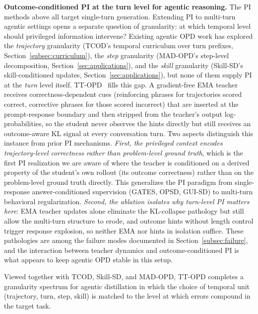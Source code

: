 \documentclass{article} %
\begin{document}
\textbf{Outcome-conditioned PI at the turn level for agentic reasoning.} The PI methods above all target single-turn generation. Extending PI to multi-turn agentic settings opens a separate question of granularity: at which temporal level should privileged information intervene? Existing agentic OPD work has explored the \emph{trajectory} granularity (TCOD's temporal curriculum over turn prefixes, Section~\ref{subsec:curriculum}), the \emph{step} granularity (MAD-OPD's step-level decomposition, Section~\ref{sec:applications}), and the \emph{skill} granularity (Skill-SD's skill-conditioned updates, Section~\ref{sec:applications}), but none of them supply PI at the \emph{turn} level itself. TT-OPD~\citep{ttopd2026} fills this gap. A gradient-free EMA teacher receives correctness-dependent cues (reinforcing phrases for trajectories scored correct, corrective phrases for those scored incorrect) that are inserted at the prompt-response boundary and then stripped from the teacher's output log-probabilities, so the student never observes the hints directly but still receives an outcome-aware KL signal at every conversation turn. Two aspects distinguish this instance from prior PI mechanisms. \emph{First, the privileged context encodes trajectory-level correctness rather than problem-level ground truth}, which is the first PI realization we are aware of where the teacher is conditioned on a derived property of the student's own rollout (its outcome correctness) rather than on the problem-level ground truth directly. This generalizes the PI paradigm from single-response answer-conditioned supervision (GATES, OPSD, GUI-SD) to multi-turn behavioral regularization. \emph{Second, the ablation isolates why turn-level PI matters here}: EMA teacher updates alone eliminate the KL-collapse pathology but still allow the multi-turn structure to erode, and outcome hints without length control trigger response explosion, so neither EMA nor hints in isolation suffice. These pathologies are among the failure modes documented in Section~\ref{subsec:failure}, and the interaction between teacher dynamics and outcome-conditioned PI is what appears to keep agentic OPD stable in this setup.

Viewed together with TCOD, Skill-SD, and MAD-OPD, TT-OPD completes a granularity spectrum for agentic distillation in which the choice of temporal unit (trajectory, turn, step, skill) is matched to the level at which errors compound in the target task.
\end{document}

